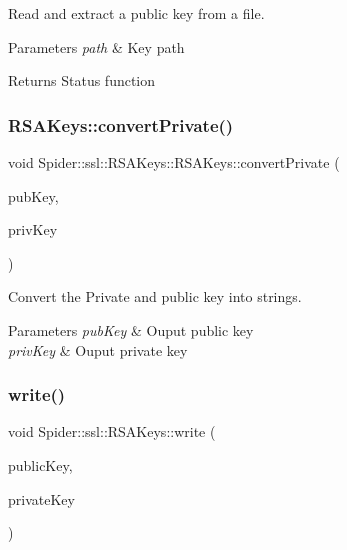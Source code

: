 Read and extract a public key from a file. 


\begin{DoxyParams}{Parameters}
{\em path} & Key path \\
\hline
\end{DoxyParams}
\begin{DoxyReturn}{Returns}
Status function 
\end{DoxyReturn}
\mbox{\label{class_spider_1_1ssl_1_1_r_s_a_keys_aabe857dba27e4cc8bd1d2a09b65082b8}} 
\subsubsection{\texorpdfstring{R\+S\+A\+Keys\+::convert\+Private()}{RSAKeys::convertPrivate()}}
{\footnotesize\ttfamily void Spider\+::ssl\+::\+R\+S\+A\+Keys\+::\+R\+S\+A\+Keys\+::convert\+Private (\begin{DoxyParamCaption}\item[{std\+::string \&}]{pub\+Key,  }\item[{std\+::string \&}]{priv\+Key }\end{DoxyParamCaption})}



Convert the Private and public key into strings. 


\begin{DoxyParams}{Parameters}
{\em pub\+Key} & Ouput public key \\
\hline
{\em priv\+Key} & Ouput private key \\
\hline
\end{DoxyParams}
\mbox{\label{class_spider_1_1ssl_1_1_r_s_a_keys_a765563842f5a69b424d72cab3a77b678}} 
\subsubsection{\texorpdfstring{write()}{write()}}
{\footnotesize\ttfamily void Spider\+::ssl\+::\+R\+S\+A\+Keys\+::write (\begin{DoxyParamCaption}\item[{F\+I\+LE $\ast$}]{public\+Key,  }\item[{F\+I\+LE $\ast$}]{private\+Key }\end{DoxyParamCaption})}



